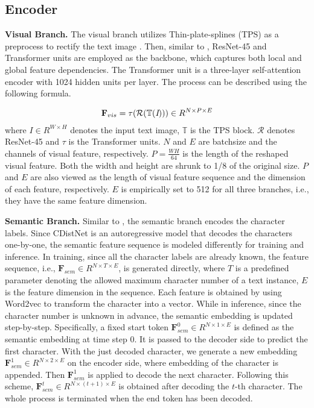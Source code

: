 \subsection{Encoder}

\noindent\textbf{Visual Branch.}
The visual branch utilizes Thin-plate-splines (TPS) as a preprocess to rectify the text image \citep{shi2018aster,Baekwhats_wrong_19ICCV}. Then, similar to \citep{ABInet21CVPR,SRNyu2020towards}, ResNet-45 and Transformer units are employed as the backbone, which captures both local and global feature dependencies. The Transformer unit is a three-layer self-attention encoder with 1024 hidden units per layer. The process can be described using the following formula.

\begin{equation}
\begin{aligned}
\textbf{F}_{vis} = \tau(\mathcal{R}( \mathbb{T}(\emph{I})))\in{R}^{N \times P\times E}
\end{aligned}
\end{equation}
where $I\in{R}^{W \times H}$ denotes the input text image, $\mathbb{T}$ is the TPS block. $\mathcal{R}$ denotes ResNet-45 and $\tau$ is the Transformer units. $N$ and $E$ are batchsize and the channels of visual feature, respectively. $P=\frac{WH}{64}$ is the length of the reshaped visual feature. Both the width and height are shrunk to 1/8 of the original size. $P$ and $E$ are also viewed as the length of visual feature sequence and the dimension of each feature, respectively. $E$ is empirically set to 512 for all three branches, i.e., they have the same feature dimension.

\noindent\textbf{Semantic Branch.}
Similar to \citep{sheng2019nrtr,yue2020robustscanner}, the semantic branch encodes the character labels. Since CDistNet is an autoregressive model that decodes the characters one-by-one, the semantic feature sequence is modeled differently for training and inference. In training, since all the character labels are already known, the feature sequence, i.e., $\textbf{F}_{sem}\in R^{N\times T\times E }$, is generated directly, where $T$ is a predefined parameter denoting the allowed maximum character number of a text instance, $E$ is the feature dimension in the sequence. Each feature is obtained by using Word2vec to transform the character into a vector. While in inference, since the character number is unknown in advance, the semantic embedding is updated step-by-step. Specifically, a fixed start token $\textbf{F}^0_{sem}\in R^{N\times 1\times E}$ is defined as the semantic embedding at time step 0. It is passed to the decoder side to predict the first character. With the just decoded character, we generate a new embedding $\textbf{F}^1_{sem}\in R^{N\times 2\times E}$ on the encoder side, where embedding of the character is appended. Then $\textbf{F}^1_{sem}$ is applied to decode the next character. Following this scheme, $\textbf{F}^t_{sem}\in R^{N\times (t+1)\times E}$ is obtained after decoding the $t$-th character. The whole process is terminated when the end token has been decoded.

